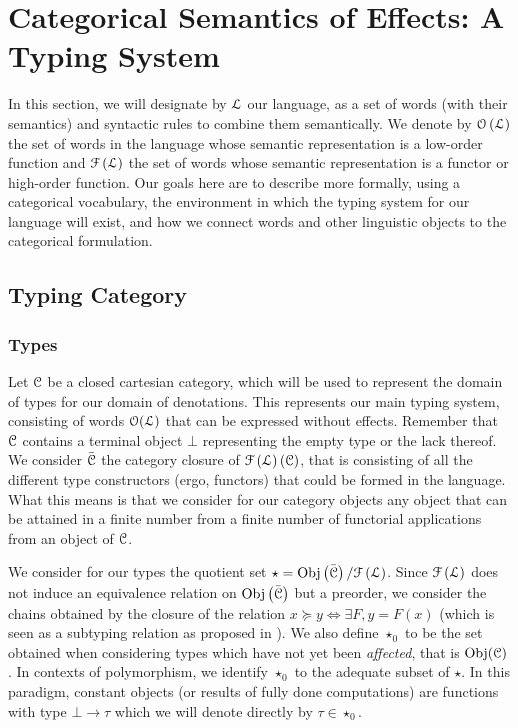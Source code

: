 \section{Categorical Semantics of Effects: A Typing System}
\label{sec:typingsystem}
In this section, we will designate by $\mathcal{L}$ our language, as a set of words
(with their semantics) and syntactic rules to combine them semantically.
We denote by $\mathcal{O}\left( \mathcal{L} \right)$ the set of words in the language whose
semantic representation is a low-order function and $\mathcal{F}\left( \mathcal{L} \right)$ the
set of words whose semantic representation is a functor or high-order function.
Our goals here are to describe more formally, using a categorical vocabulary,
the environment in which the typing system for our language will exist, and how
we connect words and other linguistic objects to the categorical formulation.

\subsection{Typing Category}\label{subsec:typingcategory}
\subsubsection{Types}\label{subsubsec:types}
Let $\mathcal{C}$ be a closed cartesian category, which will be used to represent the
domain of types for our domain of denotations.
This represents our main typing system, consisting of words $\mathcal{O}(\mathcal{L})$ that can
be expressed without effects.
Remember that $\mathcal{C}$ contains a terminal object $\bot$ representing the empty
type or the lack thereof.
We consider $\bar{\mathcal{C}}$ the category closure of
$\mathcal{F}\left( \mathcal{L} \right)\left(\mathcal{C}\right)$, that is consisting of
all the different type constructors (ergo, functors) that could be formed in
the language.
What this means is that we consider for our category objects any object that
can be attained in a finite number from a finite number of functorial
applications from an object of $\mathcal{C}$.

We consider for our types the quotient set
$\star = \mathrm{Obj}\left( \bar{\mathcal{C}} \right)/\mathcal{F}\left( \mathcal{L} \right)$.
Since $\mathcal{F}\left( \mathcal{L} \right)$ does not induce an equivalence relation on
$\operatorname{Obj}\left( \bar{\mathcal{C}} \right)$ but a preorder, we consider the chains obtained
by the closure of the relation $x\succeq y \Leftrightarrow \exists F, y = F(x)$
(which is seen as a subtyping relation as proposed in
\cite{melliesFunctorsAreType2015}).
We also define $\star_{0}$ to be the set obtained when considering types which
have not yet been \emph{affected}, that is $\operatorname{Obj}(\mathcal{C})$.
In contexts of polymorphism, we identify $\star_{0}$ to the adequate subset of
$\star$.
In this paradigm, constant objects (or results of fully done computations) are
functions with type $\bot \to \tau$ which we will denote directly by
$\tau \in \star_{0}$.

